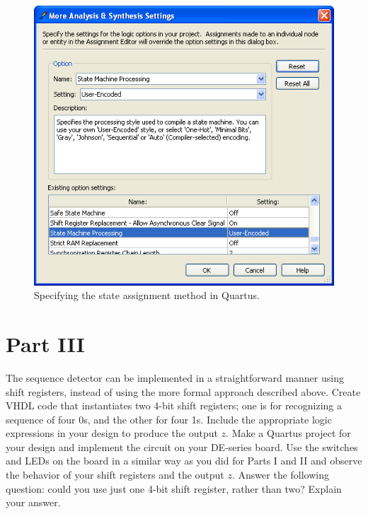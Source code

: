 \documentclass[epsfig,10pt,fullpage]{article}
\begin{document}
\begin{figure}[H]
\centerline{
\includegraphics[scale = 0.75]{figures/figure4.png}}
\caption{Specifying the state assignment method in Quartus.}
\label{fig:fig7_4}
\end{figure}

\section*{Part III}
The sequence detector can be implemented in a straightforward manner using shift registers,
instead of using the more formal approach described above. Create VHDL code that
instantiates two 4-bit shift registers; one is for recognizing a sequence of four 0s, and
the other for four 1s. Include the appropriate logic expressions in your design
to produce the output $z$. Make a Quartus project for your design and implement
the circuit on your DE-series board. Use the switches and LEDs on the board in a similar way as
you did for Parts I and II and observe the behavior of your shift registers and the
output $z$. Answer the following question: could you use just one 4-bit shift
register, rather than two? Explain your answer.

~\newpage
\end{document}
